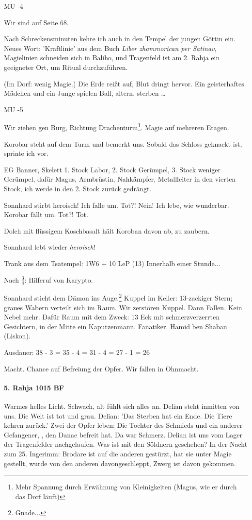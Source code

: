 {\color{red} MU -4}

{\color{green} Wir sind auf Seite 68.}

Nach Schreckensminuten kehre ich auch in den Tempel der jungen Göttin ein. Neues Wort: 'Kraftlinie' aus dem Buch \emph{Liber zhammorican per Satinav}, Magielinien schneiden sich in Baliho, und Tragenfeld ist am 2. Rahja ein geeigneter Ort, um Ritual durchzuführen. 

(Im Dorf: wenig Magie.)
Die Erde reißt auf, Blut dringt hervor. Ein geisterhaftes Mädchen und ein Junge spielen Ball, altern, sterben \dots

{\color{red} MU -5}

Wir ziehen gen Burg, Richtung Drachenturm\footnote{Mehr Spannung durch Erwähnung von Kleinigkeiten (Magus, wie er durch das Dorf läuft)}.
Magie auf mehreren Etagen. 

Korobar steht auf dem Turm und bemerkt uns. Sobald das Schloss geknackt ist, sprinte ich vor.  

EG Banner, Skelett 1. Stock Labor, 2. Stock Gerümpel, 3. Stock weniger Gerümpel, dafür Magus, Armbrüstin, Nahkämpfer, Metallleiter in den vierten Stock, ich werde in den 2. Stock zurück gedrängt. 


Sonnhard stirbt heroisch!
Ich falle um. Tot?! Nein! Ich lebe, wie wunderbar.
Korobar fällt um. Tot?! Tot.

Dolch mit flüssigem Koschbasalt hält Koroban davon ab, zu zaubern.

Sonnhard lebt wieder \emph{heroisch}! 

Trank aus dem Tsatempel: 1W6 + 10 LeP (13) Innerhalb einer Stunde...

Nach $\frac{3}{4}$: Hilferuf von Karypto.

Sonnhard sticht dem Dämon ins Auge.\footnote{Gnade...}
Kuppel im Keller: 13-zackiger Stern; graues Wabern verteilt sich im Raum. Wir zerstören Kuppel. Dann Fallen. Kein Nebel mehr. Dafür Raum mit dem Zweck: 13 Eck mit schmerzverzerrten Gesichtern, in der Mitte ein Kaputzenmann. Fanatiker. Hamid ben Shaban (Liskon). 

Ausdauer:  38 - 3 = 35 - 4 = 31 - 4 =  27 - 1 = 26

Macht. Chance auf Befreiung der Opfer. Wir fallen in Ohnmacht. 

\paragraph{5. Rahja 1015 BF}
Warmes helles Licht. Schwach, alt fühlt sich alles an. Delian steht inmitten von uns. 
Die Welt ist tot und grau. Delian: 'Das Sterben hat ein Ende. Die Tiere kehren zurück.' Zwei der Opfer leben: Die Tochter des Schmieds und ein anderer Gefangener, , den Danae befreit hat. Da war Schmerz. Delian ist uns vom Lager der Tragenfelder nachgelaufen. Was ist mit den Söldnern geschehen? In der Nacht zum 25. Ingerimm: Brodare ist auf die anderen gestürzt, hat sie unter Magie gestellt, wurde von den anderen davongeschleppt, Zwerg  ist davon gekommen.  

